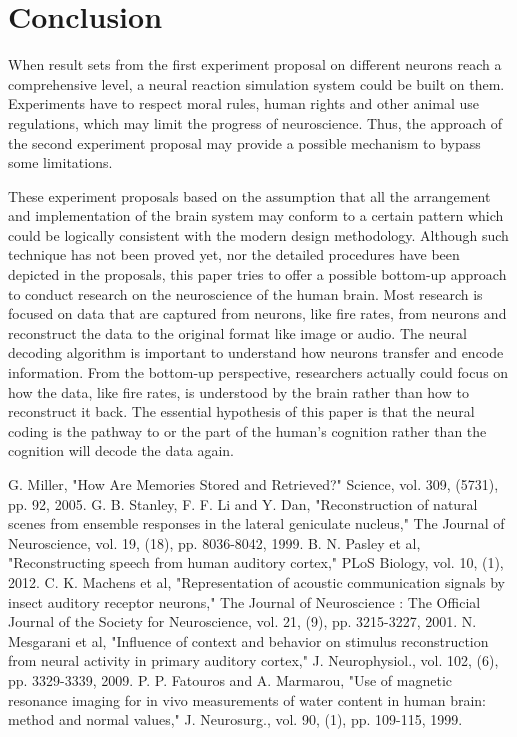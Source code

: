 \documentclass[conference]{IEEEtran}
\begin{document}
\section{Conclusion}

When result sets from the first experiment proposal on different neurons reach a comprehensive level, a neural reaction simulation system could be built on them. Experiments have to respect moral rules, human rights and other animal use regulations, which may limit the progress of neuroscience. Thus, the approach of the second experiment proposal may provide a possible mechanism to bypass some limitations. 

These experiment proposals based on the assumption that all the arrangement and implementation of the brain system may conform to a certain pattern which could be logically consistent with the modern design methodology. Although such technique has not been proved yet, nor the detailed procedures have been depicted in the proposals, this paper tries to offer a possible bottom-up approach to conduct research on the neuroscience of the human brain. Most research is focused on data that are captured from neurons, like fire rates, from neurons and reconstruct the data to the original format like image or audio. The neural decoding algorithm is important to understand how neurons transfer and encode information. From the bottom-up perspective, researchers actually could focus on how the data, like fire rates, is understood by the brain rather  than how to reconstruct it back. The essential hypothesis of this paper is that the neural coding is the pathway to or the part of the human's cognition rather than the cognition will decode the data again.


\begin{thebibliography}{00}
 G. Miller, "How Are Memories Stored and Retrieved?" Science, vol. 309, (5731), pp. 92, 2005. 
 G. B. Stanley, F. F. Li and Y. Dan, "Reconstruction of natural scenes from ensemble responses in the lateral geniculate nucleus," The Journal of Neuroscience, vol. 19, (18), pp. 8036-8042, 1999.
 B. N. Pasley et al, "Reconstructing speech from human auditory cortex," PLoS Biology, vol. 10, (1), 2012.
 C. K. Machens et al, "Representation of acoustic communication signals by insect auditory receptor neurons," The Journal of Neuroscience : The Official Journal of the Society for Neuroscience, vol. 21, (9), pp. 3215-3227, 2001.
 N. Mesgarani et al, "Influence of context and behavior on stimulus reconstruction from neural activity in primary auditory cortex," J. Neurophysiol., vol. 102, (6), pp. 3329-3339, 2009. 
 P. P. Fatouros and A. Marmarou, "Use of magnetic resonance imaging for in vivo measurements of water content in human brain: method and normal values," J. Neurosurg., vol. 90, (1), pp. 109-115, 1999. 
\end{thebibliography}
\end{document}
